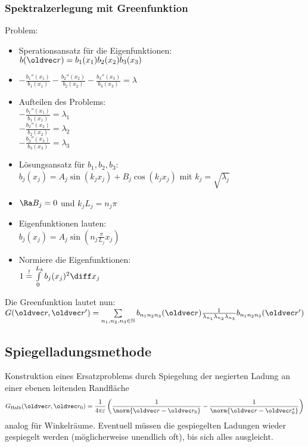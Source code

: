 \documentclass[6pt,a4paper]{scrartcl}
\let\vec\oldvec
\begin{document}
\begin{multicols}{4}
	\subsubsection{Spektralzerlegung mit Greenfunktion}
	Problem: 

	\begin{itemize}
		\item Sperationsansatz für die Eigenfunktionen: \\
		$b(\vec r) = b_1 (x_1) b_2(x_2) b_3(x_3)$
		\item $- \frac{b_1''(x_1)}{b_1 (x_1)} - \frac{b_2''(x_2)}{b_2 (x_2)}  - \frac{b_3''(x_3)}{b_3 (x_3)} = \lambda$
		\item Aufteilen des Problems: \\
		$- \frac{b_1''(x_1)}{b_1 (x_1)} = \lambda_1$ \\
		$- \frac{b_2''(x_2)}{b_2 (x_2)} = \lambda_2$ \\
		$- \frac{b_3''(x_3)}{b_3 (x_3)} = \lambda_3$
		\item Lösungsansatz für $b_1, b_2, b_3$: \\
		$b_j (x_j) = A_j \sin(k_j x_j) + B_j \cos (k_j x_j)$ mit $k_j = \sqrt{\lambda_j}$
		\item $\Ra B_j = 0$ und $k_j L_j = n_j \pi$
		\item Eigenfunktionen lauten: \\
		$b_j ( x_j ) = A_j \sin (n_j \frac{\pi}{L_j} x_j)$
		\item Normiere die Eigenfunktionen: \\
			$1 \overset{!}{=} \int \limits_0^{L_k} b_j (x_j)^2 \diff x_j$
	\end{itemize}
	
	Die Greenfunktion lautet nun: \\
	$G(\vec r, \vec r') = \sum \limits_{n_1, n_2 , n_3 \in \mathbb N} b_{n_1 n_2 n_3} (\vec r ) \frac{1}{\lambda_{n_1}\lambda_{n_2}\lambda_{n_3}} b_{n_1 n_2 n_3} (\vec r' )$
	\subsection*{Spiegelladungsmethode}
	Konstruktion eines Ersatzproblems durch Spiegelung der negierten Ladung an einer ebenen leitenden Randfläche\\
	\begin{align*}
		G_{\text{Halb}}(\vec r, \vec r_0) = \frac{1}{4 \pi \varepsilon} \left( \frac{1}{\norm{\vec r - \vec r_0}} - \frac{1}{\norm{\vec r - \vec r_0^*}}\right)
	\end{align*}
	analog für Winkelräume. Eventuell müssen die gespiegelten Ladungen wieder gespiegelt werden (möglicherweise unendlich oft), bis sich alles ausgleicht.
	

\end{multicols}
\end{document}
